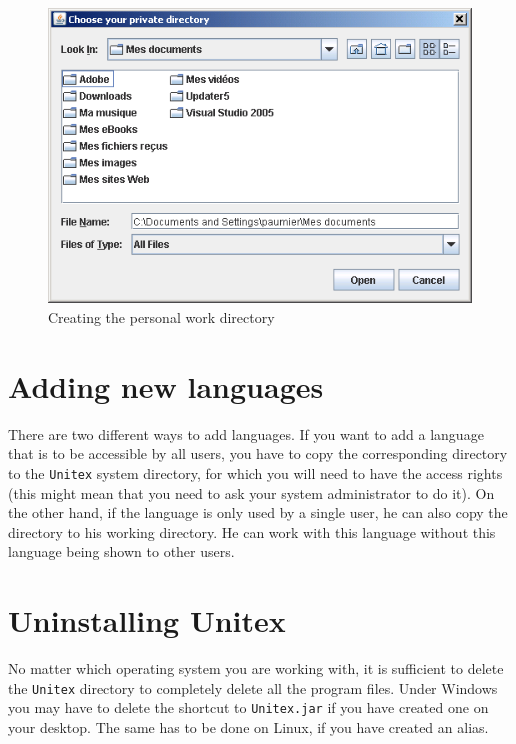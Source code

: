 \begin{figure}[h]
\begin{center}
\includegraphics[width=13cm]{resources/img/fig1-3.png}
\caption{Creating the personal work
directory\label{fig-creation-personal-directory}}
\end{center}
\end{figure}


\section{Adding new languages}

\bigskip
\noindent There are two different ways to add languages. If you want to add 
a language that is to be accessible by all  users, you have to copy the 
corresponding directory to the \verb+Unitex+ system directory, for which 
you will need to have the access rights  (this might mean that you need to 
ask your system administrator to do it). On the other hand, if the language 
is only used by a single user, he can also copy the directory to his working 
directory. He can work with this language without this language being shown to other users.


\section{Uninstalling Unitex}
No matter which operating system you are working with, it is sufficient to delete 
the \verb+Unitex+ directory to completely delete all the program files. Under
Windows you may have to delete the shortcut to \verb+Unitex.jar+  
if you have created one on your desktop. The same has to be done on Linux, if you have 
created an alias.


